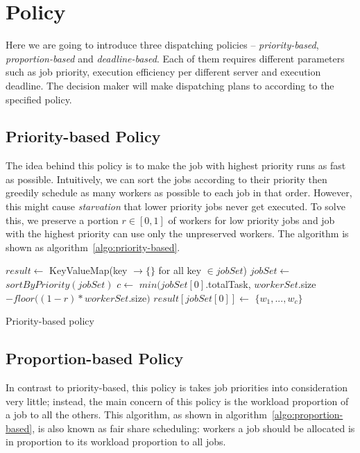 \chapter{Policy}

Here we are going to introduce three dispatching policies --
\emph{priority-based}, \emph{proportion-based} and
\emph{deadline-based}.
Each of them requires different parameters such as job priority,
execution efficiency per different server and execution deadline.
The decision maker will make dispatching plans to according to the
specified policy.


\section{Priority-based Policy}

The idea behind this policy is to make the job with highest priority
runs as fast as possible.
Intuitively, we can sort the jobs according to their priority then
greedily schedule as many workers as possible to each job in that order.
However, this might cause \emph{starvation} that lower priority jobs
never get executed.
To solve this, we preserve a portion $r \in [0,1]$ of workers for low
priority jobs and job with the highest priority can use only the
unpreserved workers.
The algorithm is shown as algorithm~\ref{algo:priority-based}.

\begin{algorithm}[H]
  \DontPrintSemicolon %
  $result \gets$
  KeyValueMap(key $\to \{\}$ for all key $\in jobSet$)\;
  $jobSet \gets$ $sortByPriority(jobSet)$\;
  $c \gets$ $min(jobSet[0]$.totalTask, $workerSet$.size$-floor((1-r) *
      workerSet.$size$)$\;
  $result[jobSet[0]] \gets$ $\{w_1, ..., w_c\}$\;
  \;
  \caption{Priority-based policy}
  \label{algo:priority-based}
\end{algorithm}

\section{Proportion-based Policy}

In contrast to priority-based, this policy is takes job priorities into
consideration very little; instead, the main concern of this policy is
the workload proportion of a job to all the others.
This algorithm, as shown in algorithm~\ref{algo:proportion-based}, is
also known as fair share scheduling: workers a job should be allocated
is in proportion to its workload proportion to all jobs. 


